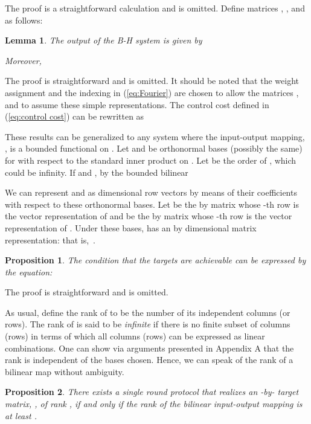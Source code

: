 \documentclass[12pt,onecolumn,draftcls]{IEEEtran}
\newtheorem{proposition}{Proposition}[section]
\newtheorem{lemma}{Lemma}[section]
\begin{document}
The proof is a straightforward calculation and is omitted.
Define matrices , , and  as follows:




\begin{lemma}
The output of the B-H system is given by 

Moreover,

\end{lemma}

The proof is straightforward and is omitted.  It should be noted that the weight assignment
and the indexing in (\ref{eq:Fourier}) are chosen to allow 
the matrices , and  to assume these simple representations.
The control cost defined in (\ref{eq:control cost}) can be rewritten as


These results can be generalized to any system
where the input-output mapping, , 
is a bounded functional on .
Let  and  be orthonormal bases (possibly the same) for  
with respect to the standard inner product on .
Let  be the order of , which could be infinity.
If  and ,
by the bounded bilinear 


We can represent  and  as  dimensional row vectors by means of their coefficients with respect
to these orthonormal bases.  Let
 be the  by  matrix whose -th row is the vector representation of  and
 be the  by  matrix whose -th row is the vector representation of .
Under these bases,  has an  by  dimensional matrix representation:
 that is,\ .


\begin{proposition}
The condition that the targets are achievable can be expressed by the equation:

\end{proposition}

The proof is straightforward and is omitted.

As usual, define the rank of  to be the number of its independent columns (or rows).
The rank of  is said to be {\em infinite} if there is no finite subset of columns (rows) in terms of which all columns (rows) can be expressed as linear combinations.  One can show via arguments presented in
Appendix A that the rank is independent of the bases chosen.
Hence, we can speak of the rank of a bilinear map without ambiguity.


\begin{proposition}
There exists a single round protocol that realizes an -by- target matrix, , of rank , 
if and only if the rank of the bilinear input-output mapping  is at least .
\end{proposition}
\end{document}
